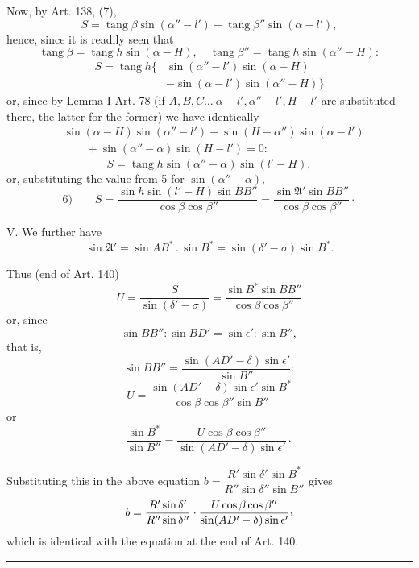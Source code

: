 Now, by Art. 138, (7),
\[
S=\operatorname{tang}\beta\sin(\alpha''-l')-\operatorname{tang}\beta''\sin(\alpha-l'),
\]
hence, since it is readily seen that
\[
\operatorname{tang}\beta=\operatorname{tang}h\sin(\alpha-H),\quad\operatorname{tang}\beta''=\operatorname{tang}h\sin(\alpha''-H):
\]
\[
\begin{aligned}
S=\operatorname{tang}h\{&\sin(\alpha''-l')\sin(\alpha-H)\\
&-\sin(\alpha-l')\sin(\alpha''-H)\}
\end{aligned}
\]
or, since by Lemma I Art. 78 (if \(A,B,C\ldots\ \alpha-l',\alpha''-l',H-l'\) are substituted there, the latter for the former) we have identically
\[
\begin{aligned}
&\sin(\alpha-H)\sin(\alpha''-l')+\sin(H-\alpha'')\sin(\alpha-l')\\
&\qquad+\sin(\alpha''-\alpha)\sin(H-l')=0:
\end{aligned}
\]
\[
S=\operatorname{tang}h\sin(\alpha''-\alpha)\sin(l'-H),
\]
or, substituting the value from 5 for \(\sin(\alpha''-\alpha)\),
\[
6)\qquad S=\frac{\sin h\sin(l'-H)\sin BB''}{\cos\beta\cos\beta''}=\frac{\sin\mathfrak{A}'\sin BB''}{\cos\beta\cos\beta''}\mathpunct{\cdot}
\]

V. We further have
\[
\sin\mathfrak{A}'=\sin AB^*\mathbin{.}\sin B^*=\sin(\delta'-\sigma)\sin B^*.
\]

Thus (end of Art. 140)
\[
U=\frac{S}{\sin(\delta'-\sigma)}=\frac{\sin B^*\sin BB''}{\cos\beta\cos\beta''}
\]
or, since
\[
\sin BB'':\sin BD'=\sin\epsilon':\sin B'',
\]
that is,
\[
\sin BB''=\frac{\sin(AD'-\delta)\sin\epsilon'}{\sin B''}:
\]
\[
U=\frac{\sin(AD'-\delta)\sin\epsilon'\sin B^*}{\cos\beta\cos\beta''\sin B''}
\]
or
\[
\frac{\sin B^*}{\sin B''}=\frac{U\cos\beta\cos\beta''}{\sin(AD'-\delta)\sin\epsilon'}\mathpunct{\cdot}
\]

Substituting this in the above equation \(b=\dfrac{R'\sin\delta'\sin B^*}{R''\sin\delta''\sin B''}\) gives
\[
b=\frac{R'\sin\delta'}{R''\sin\delta''}\cdot\frac{U\cos\beta\cos\beta''}{\sin(AD'-\delta)\sin\epsilon'}\mathpunct{\raisebox{.45ex}{,}}
\]
which is identical with the equation at the end of Art. 140.
\begin{center}\rule{.18\textwidth}{.35pt}\end{center}
